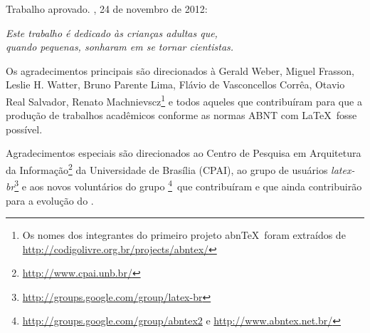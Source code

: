 \documentclass[
	12pt,				%
	oneside,			%
	a4paper,			%
	chapter=TITLE,		%
	english,			%
	brazil				%
	]{abntex2wall}
\begin{document}
{\begin{folhadeaprovacao}
	Trabalho aprovado. \imprimirlocal, 24 de novembro de 2012:
	
	
	\begin{center}
		\vspace*{0.5cm}
		{\large\imprimirlocal}
		\par
		{\large\imprimirdata}
		\vspace*{1cm}
	\end{center}
	
\end{folhadeaprovacao}

\begin{dedicatoria}
	\vspace*{\fill}
	\centering
	\noindent
	\textit{ Este trabalho é dedicado às crianças adultas que,\\
		quando pequenas, sonharam em se tornar cientistas.} \vspace*{\fill}
\end{dedicatoria}

\begin{agradecimentos}
	Os agradecimentos principais são direcionados à Gerald Weber, Miguel Frasson,
	Leslie H. Watter, Bruno Parente Lima, Flávio de Vasconcellos Corrêa, Otavio Real
	Salvador, Renato Machnievscz\footnote{Os nomes dos integrantes do primeiro
		projeto abn\TeX\ foram extraídos de
		\url{http://codigolivre.org.br/projects/abntex/}} e todos aqueles que
	contribuíram para que a produção de trabalhos acadêmicos conforme
	as normas ABNT com \LaTeX\ fosse possível.
	
	Agradecimentos especiais são direcionados ao Centro de Pesquisa em Arquitetura
	da Informação\footnote{\url{http://www.cpai.unb.br/}} da Universidade de
	Brasília (CPAI), ao grupo de usuários
	\emph{latex-br}\footnote{\url{http://groups.google.com/group/latex-br}} e aos
	novos voluntários do grupo
	\emph{\abnTeX}\footnote{\url{http://groups.google.com/group/abntex2} e
		\url{http://www.abntex.net.br/}}~que contribuíram e que ainda
	contribuirão para a evolução do \abnTeX.
	
\end{agradecimentos}
}{
}
\end{document}
